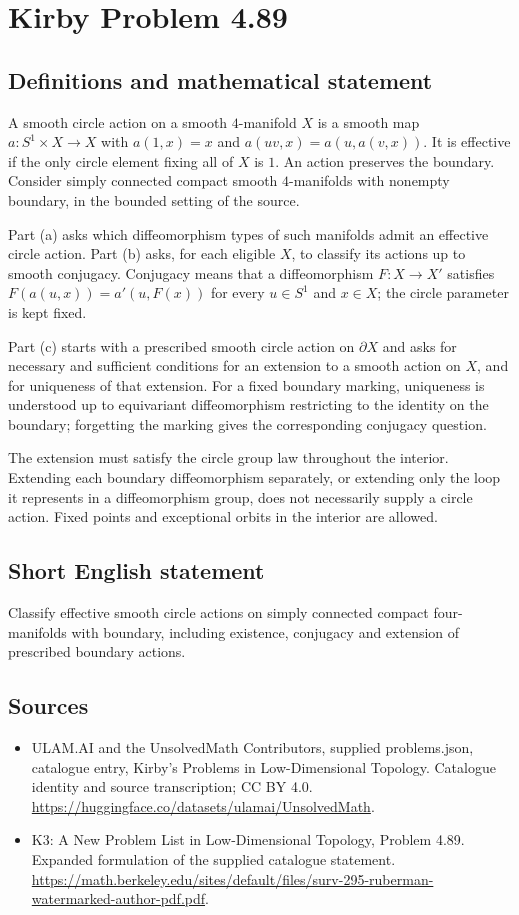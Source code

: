 \documentclass[11pt,a4paper]{article}
\begin{document}
\section*{Kirby Problem 4.89}\label{statement}

\subsection{Definitions and mathematical statement}
A smooth circle action on a smooth $4$-manifold $X$ is a smooth
map $a:S^1\times X\to X$ with $a(1,x)=x$ and
$a(uv,x)=a(u,a(v,x))$. It is effective if the only circle element
fixing all of $X$ is $1$. An action preserves the boundary.
Consider simply connected compact smooth $4$-manifolds with nonempty
boundary, in the bounded setting of the source.

Part (a) asks which diffeomorphism types of such manifolds admit
an effective circle action. Part (b) asks, for each eligible $X$,
to classify its actions up to smooth conjugacy. Conjugacy means
that a diffeomorphism $F:X\to X'$ satisfies
$F(a(u,x))=a'(u,F(x))$ for every $u\in S^1$ and $x\in X$;
the circle parameter is kept fixed.

Part (c) starts with a prescribed smooth circle action on
$\partial X$ and asks for necessary and sufficient conditions for
an extension to a smooth action on $X$, and for uniqueness of
that extension. For a fixed boundary marking, uniqueness is
understood up to equivariant diffeomorphism restricting to the
identity on the boundary; forgetting the marking gives the
corresponding conjugacy question.

The extension must satisfy the circle group law throughout the
interior. Extending each boundary diffeomorphism separately, or
extending only the loop it represents in a diffeomorphism group,
does not necessarily supply a circle action. Fixed points and
exceptional orbits in the interior are allowed.
\subsection{Short English statement}
Classify effective smooth circle actions on simply connected compact four-manifolds with boundary, including existence, conjugacy and extension of prescribed boundary actions.
\subsection{Sources}
\begin{itemize}
\item[S1] ULAM.AI and the UnsolvedMath Contributors, supplied problems.json, catalogue entry, Kirby's Problems in Low-Dimensional Topology. Catalogue identity and source transcription; CC BY 4.0.
\url{https://huggingface.co/datasets/ulamai/UnsolvedMath}.
\item[S2] K3: A New Problem List in Low-Dimensional Topology, Problem 4.89. Expanded formulation of the supplied catalogue statement.
\url{https://math.berkeley.edu/sites/default/files/surv-295-ruberman-watermarked-author-pdf.pdf}.
\end{itemize}
\end{document}
